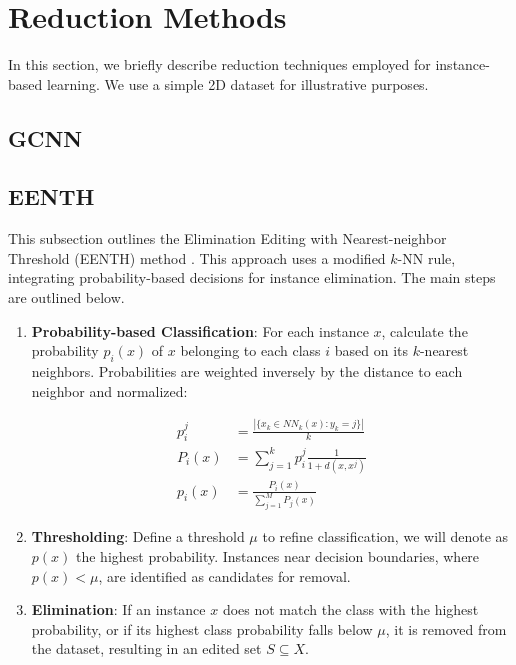 
\section{Reduction Methods}
In this section, we briefly describe reduction techniques employed for instance-based learning. We use a simple 2D dataset for illustrative purposes.

\subsection{GCNN}


\subsection{EENTH}
This subsection outlines the Elimination Editing with Nearest-neighbor Threshold (EENTH) method \cite{vazquez2005}. This approach uses a modified $k$-NN rule, integrating probability-based decisions for instance elimination. The main steps are outlined below.

\begin{enumerate}
    \item \textbf{Probability-based Classification}: For each instance $ x $, calculate the probability $ p_i(x) $ of $ x $ belonging to each class $ i $ based on its $k$-nearest neighbors. Probabilities are weighted inversely by the distance to each neighbor and normalized:


	\begin{center}
	\begin{align}
		p_i^j &= \frac{|\{x_k \in NN_k(x) : y_k=j \}|}{k} \\
		P_i(x) &= \sum_{j=1}^{k} p_i^j \frac{1}{1 + d(x, x^j)} \\
		p_i(x) &= \frac{P_i(x)}{\sum_{j=1}^{M} P_j(x)}
	\end{align}
	\end{center}

    
    \item \textbf{Thresholding}: Define a threshold $ \mu $ to refine classification, we will denote as $p(x)$ the highest probability. Instances near decision boundaries, where $ p(x) < \mu $, are identified as candidates for removal.
    
    \item \textbf{Elimination}: If an instance $ x $ does not match the class with the highest probability, or if its highest class probability falls below $ \mu $, it is removed from the dataset, resulting in an edited set $ S \subseteq X $.
\end{enumerate}

